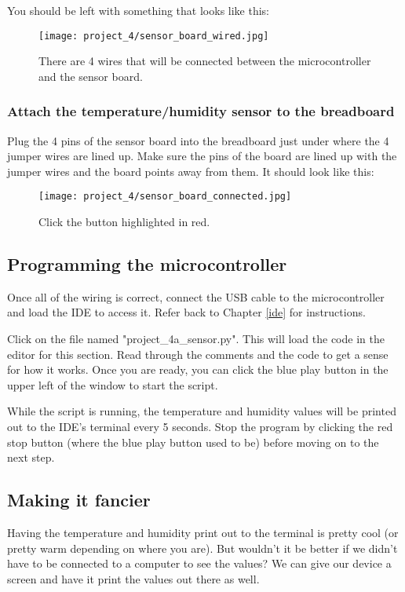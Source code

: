 You should be left with something that looks like this:
\begin{figure}[H]
    \centering
    \texttt{[image: project\_4/sensor\_board\_wired.jpg]}
    \caption{There are 4 wires that will be connected between the microcontroller and the sensor board.}
\end{figure}

\subsubsection{Attach the temperature/humidity sensor to the breadboard}
Plug the 4 pins of the sensor board into the breadboard just under where the 4 jumper wires are lined up. Make sure the pins
of the board are lined up with the jumper wires and the board points away from them. It should look like this:

\begin{figure}[H]
    \centering
    \texttt{[image: project\_4/sensor\_board\_connected.jpg]}
    \caption{Click the button highlighted in red.}
\end{figure}

\subsection{Programming the microcontroller}
Once all of the wiring is correct, connect the USB cable to the microcontroller and load the IDE to
access it. Refer back to Chapter \ref{ide} for instructions.

Click on the file named "project\_4a\_sensor.py". This will load the code in the editor for this section.
Read through the comments and the code to get a sense for how it works. Once you are ready, you can
click the blue play button in the upper left of the window to start the script.

While the script is running, the temperature and humidity values will be printed out to the IDE's terminal
every 5 seconds. Stop the program by clicking the red stop button (where the blue play button used to be)
before moving on to the next step.

\subsection{Making it fancier}
Having the temperature and humidity print out to the terminal is pretty cool (or pretty warm depending on where you are).
But wouldn't it be better if we didn't have to be connected to a computer to see the values? We can give
our device a screen and have it print the values out there as well.

